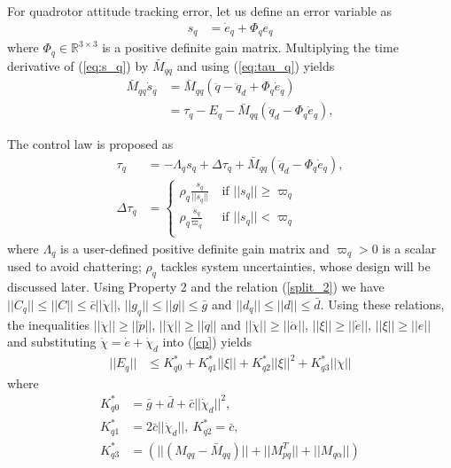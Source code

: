 \documentclass[letterpaper, 10 pt, conference]{ieeeconf}  %
\begin{document}
For quadrotor attitude tracking error, let us define an error variable as
\begin{align}
     s_q &= \dot{e}_q + \Phi_q e_q \label{eq:s_p}
 \end{align}
where $\Phi_{q} \in \mathbb{R}^{3 \times 3}$ is a positive definite gain matrix. Multiplying the time derivative of (\ref{eq:s_q}) by $\bar{M}_{qq}$ and  using (\ref{eq:tau_q}) yields
\begin{align}
\bar{M}_{qq} \dot{s}_q &= \bar{M}_{qq}(\ddot{q}- \ddot{q}_d+ \Phi_{q} {\dot{e}_q}) \nonumber \\ 
&= {\tau_{q}}- {E}_{q} - \bar{M}_{qq}(\ddot{q}_d- \Phi_{q} {\dot{e}_q}), \label{eq:sq_dot}
\end{align}

The control law is proposed as
\begin{subequations}\label{ct2}
\begin{align}
\tau_{q} &= -\Lambda_{q} s_q + \Delta \tau_{q} + \bar{M}_{qq}(\ddot{q}_d- \Phi_{q} {\dot{e}_q}),  \label{tau_q}\\
\Delta \tau_{q} &= \begin{cases}
    \rho_{q} \frac{s_{q}}{||s_{q}||}       & ~ \text{if } || s_{q}|| \geq \varpi_q\\
    \label{del_q}
    \rho_{q} \frac{s_{q}}{\varpi_q}       & ~ \text{if } || s_{q}|| < \varpi_q\\
    \end{cases}
\end{align}
\end{subequations}
where $\Lambda_{q}$ is a user-defined positive definite gain matrix and $\varpi_{q} > 0$ is a scalar used to avoid chattering; $\rho_{q}$ tackles system uncertainties, whose design will be discussed later.
Using Property 2 and the relation (\ref{split_2}) we have $||C_{q}|| \leq ||C|| \leq \bar{c}||\dot{\chi}||$, $||g_{q}|| \leq ||g|| \leq \bar{g}$ and $||d_{q}|| \leq ||d|| \leq \bar{d}$. Using these relations, the inequalities $||\ddot{\chi}|| \geq ||\ddot{p}||$, $||\ddot{\chi}|| \geq ||\ddot{q}||$ and $||\ddot{\chi}|| \geq ||\ddot{\alpha}||$, $||\xi|| \geq ||\dot{e}||$, $||\xi|| \geq ||{e}||$ and substituting $\dot{\chi} = \dot{e} + \dot{\chi}_d$ into (\ref{cp}) yields
\begin{align} 
||E_{q}|| &\leq K_{q0}^*  +K_{q1}^*||\xi||+ K_{q2}^*||\xi||^2 + K_{q3}^*||\ddot{\chi}||\label{up_bound_q} 
\end{align}
where
\begin{align*}
 K_{q0}^* &= \bar{g} + \bar{d} + \bar{c}||\dot{\chi}_d||^2,\\
K_{q1}^* &= 2\bar{c}|| \dot{\chi}_d||,~
K_{q2}^* = \bar{c}, \\
K_{q3}^* &=  (||(M_{qq} - \bar{M}_{qq} )||+ ||M^T_{pq}|| + ||M_{q\alpha}||)
\end{align*}
\end{document}
